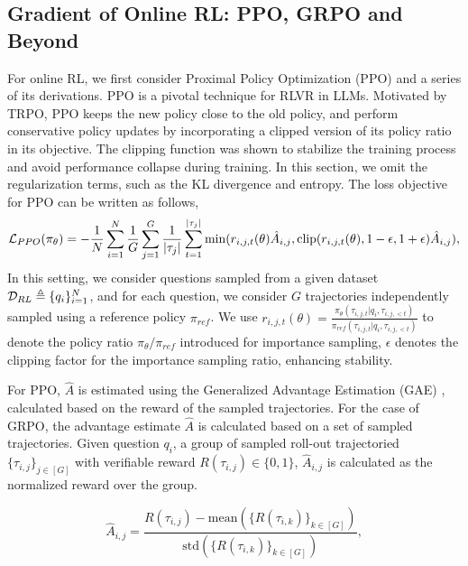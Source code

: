 \subsection{Gradient of Online RL: PPO, GRPO and Beyond}
For online RL, we first consider Proximal Policy Optimization (PPO) \citep{schulman2017proximal} and a series of its derivations. PPO is a pivotal technique for RLVR in LLMs. Motivated by TRPO, PPO keeps the new policy close to the old policy, and perform conservative policy updates by incorporating a clipped version of its policy ratio in its objective. The clipping function was shown to stabilize the training process and avoid performance collapse during training. In this section, we omit the regularization terms, such as the KL divergence and entropy. The loss objective for PPO can be written as follows,
\begin{equation}\label{eq_PPO_loss}
    \mathcal{L}_{PPO}(\pi_\theta) = 
    - \frac{1}{N}\sum_{i=1}^N \frac{1}{G}\sum_{j=1}^G \frac{1}{|\tau_j|} \sum_{t=1}^{|\tau_j|} 
        \min (r_{i,j,t}(\theta) \hat{A}_{i,j}, \text{clip}(r_{i,j,t}(\theta), 1-\epsilon, 1+\epsilon)  \hat{A}_{i,j}),
\end{equation}
In this setting, we consider questions sampled from a given dataset $\mathcal{D}_{RL} \triangleq \{q_i\}_{i=1}^N$, and for each question, we consider $G$ trajectories independently sampled using a reference policy $\pi_{ref}$.
We use $r_{i,j,t}(\theta) = \frac{\pi_\theta (\tau_{i,j,t} |q_i, \tau_{i,j, <t} ) }{\pi_{ref} (\tau_{i,j,t} |q_i, \tau_{i,j, <t} )}$ to denote the policy ratio $\pi_\theta / \pi_{ref}$ introduced for importance sampling, $\epsilon$ denotes the clipping factor for the importance sampling ratio, enhancing stability.


For PPO, $\hat{A}$ is estimated using the Generalized Advantage Estimation (GAE) \citep{schulman2015high}, calculated based on the reward of the sampled trajectories. For the case of GRPO, the advantage estimate $\hat{A}$ is calculated based on a set of sampled trajectories. Given question $q_i$, a group of sampled roll-out trajectoried $\{\tau_{i,j}\}_{j \in [G]}$ with verifiable reward $R(\tau_{i,j}) \in \{0, 1\}$, $\hat{A}_{i,j}$ is calculated as the normalized reward over the group.

\begin{equation}\label{eq_A_GRPO}
    \hat{A}_{i,j} = \frac{R(\tau_{i,j}) - \text{mean} (\{R(\tau_{i,k})\}_{k \in [G]})}{ \text{std} (\{R(\tau_{i,k})\}_{k \in [G]})},
\end{equation}

